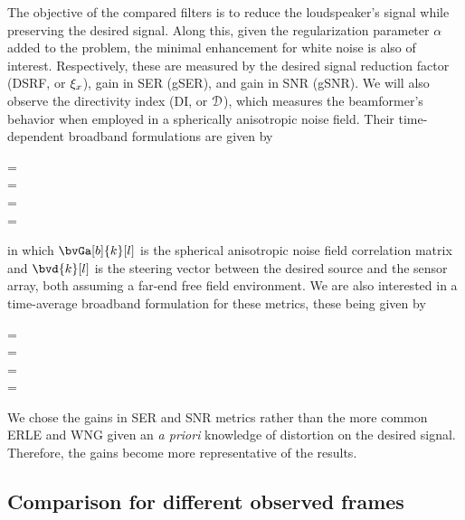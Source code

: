 The objective of the compared filters is to reduce the loudspeaker's signal while preserving the desired signal. Along this, given the regularization parameter $\alpha$ added to the problem, the minimal enhancement for white noise is also of interest. Respectively, these are measured by the desired signal reduction factor (DSRF, or $\xi_{x}$), gain in SER (gSER), and gain in SNR (gSNR). We will also observe the directivity index (DI, or $\mathcal{D}$), which measures the beamformer's behavior when employed in a spherically anisotropic noise field. Their time-dependent broadband formulations are given by
\begin{subgather}
	\dsrf[l] =  \\
	\gser[l] =  \cdot {}\\
	\gsnr[l] =  \cdot {} \\
	\di[l] = 
\end{subgather}
in which $\bvGa[b]{k}[l]$ is the spherical anisotropic noise field correlation matrix \cite{habets_generating_2007} and $\bvd{k}[l]$ is the steering vector between the desired source and the sensor array, both assuming a far-end free field environment. We are also interested in a time-average broadband formulation for these metrics, these being given by
\begin{subgather}
	\dsrf =  \\
	\gser =  \cdot {} \\
	\gsnr =  \cdot {} \\
	\di = 
\end{subgather}

We chose the gains in SER and SNR metrics rather than the more common ERLE and WNG \cite{wada_enhancement_2012} given an \textit{a priori} knowledge of distortion on the desired signal. Therefore, the gains become more representative of the results.

\subsection{Comparison for different observed frames}

